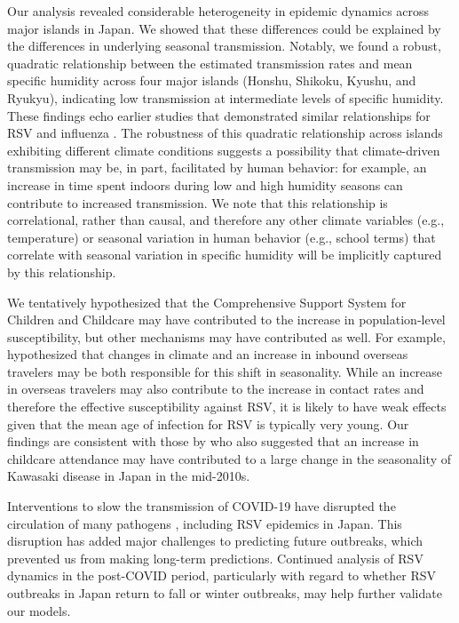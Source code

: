 \documentclass[12pt]{article}
\begin{document}
Our analysis revealed considerable heterogeneity in epidemic dynamics across major islands in Japan.
We showed that these differences could be explained by the differences in underlying seasonal transmission.
Notably, we found a robust, quadratic relationship between the estimated transmission rates and mean specific humidity across four major islands (Honshu, Shikoku, Kyushu, and Ryukyu), indicating low transmission at intermediate levels of specific humidity.
These findings echo earlier studies that demonstrated similar relationships for RSV \citep{baker2019epidemic} and influenza \citep{tamerius2013environmental}.
The robustness of this quadratic relationship across islands exhibiting different climate conditions suggests a possibility that climate-driven transmission may be, in part, facilitated by human behavior: for example, an increase in time spent indoors during low and high humidity seasons can contribute to increased transmission.
We note that this relationship is correlational, rather than causal, and therefore any other climate variables (e.g., temperature) or seasonal variation in human behavior (e.g., school terms) that correlate with seasonal variation in specific humidity will be implicitly captured by this relationship.

We tentatively hypothesized that the Comprehensive Support System for Children and Childcare may have contributed to the increase in population-level susceptibility, but other mechanisms may have contributed as well.
For example, \cite{wagatsuma2021shifts} hypothesized that changes in climate and an increase in inbound overseas travelers may be both responsible for this shift in seasonality.
While an increase in overseas travelers may also contribute to the increase in contact rates and therefore the effective susceptibility against RSV, it is likely to have weak effects given that the mean age of infection for RSV is typically very young.
Our findings are consistent with those by \cite{dehaan2024age} who also suggested that an increase in childcare attendance may have contributed to a large change in the seasonality of Kawasaki disease in Japan in the mid-2010s.

Interventions to slow the transmission of COVID-19 have disrupted the circulation of many pathogens \citep{baker2020impact,eden2022off,chen2024covid,park2024predicting}, including RSV epidemics in Japan.
This disruption has added major challenges to predicting future outbreaks, which prevented us from making long-term predictions.
Continued analysis of RSV dynamics in the post-COVID period, particularly with regard to whether RSV outbreaks in Japan return to fall or winter outbreaks, may help further validate our models.
\end{document}
